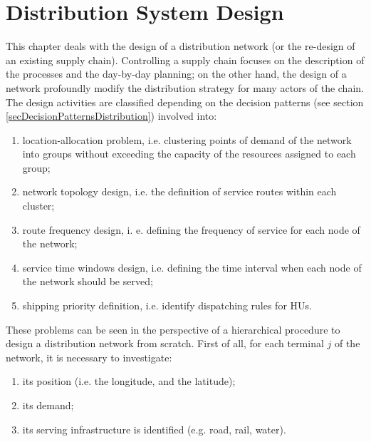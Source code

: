 \chapter{Distribution System Design} \label{chapDistDesign}

This chapter deals with the design of a distribution network (or the re-design of an existing supply chain). Controlling a supply chain focuses on the description of the processes and the day-by-day planning; on the other hand, the design of a network profoundly modify the distribution strategy for many actors of the chain. The design activities are classified depending on the decision patterns (see section \ref{secDecisionPatternsDistribution}) involved into:

\begin{enumerate}
    \item location-allocation problem, i.e. clustering points of demand of the network into groups without exceeding the capacity of the resources assigned to each group;
    \item network topology design, i.e. the definition of service routes within each cluster;
    \item route frequency design, i. e. defining the frequency of service for each node of the network;
    \item service time windows design, i.e. defining the time interval when each node of the network should be served;
    \item shipping priority definition, i.e. identify dispatching rules for HUs.

\end{enumerate}

These problems can be seen in the perspective of a hierarchical procedure to design a distribution network from scratch. First of all, for each terminal $j$ of the network, it is necessary to investigate:

\begin{enumerate}
    \item its position (i.e. the longitude, and the latitude);
    \item its demand;
    \item its serving infrastructure is identified (e.g. road, rail, water).
\end{enumerate}

